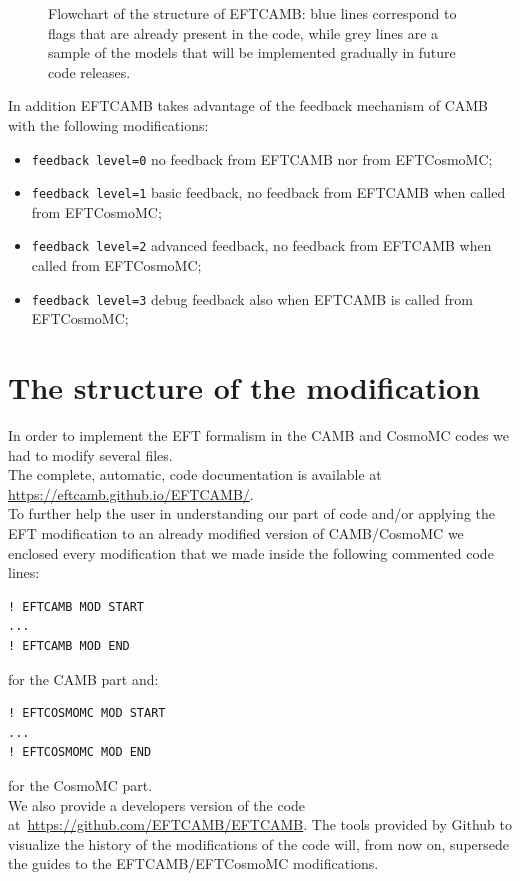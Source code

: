 \documentclass[prd,nofootinbib,showpacs]{revtex4}
\begin{document}
{\begin{figure}[!tp]
\begin{center}
 \caption{\label{Fig:StructureFlowChart} Flowchart of the structure of EFTCAMB: blue lines correspond to flags that are already present in the code, while grey lines are a sample of the models that will be implemented gradually in future code releases.} 
\end{center}
\end{figure}
%
In addition EFTCAMB takes advantage of the feedback mechanism of CAMB with the following modifications:
\begin{itemize}
\item \texttt{feedback level=0} no feedback from EFTCAMB nor from EFTCosmoMC;
\item \texttt{feedback level=1} basic feedback, no feedback from EFTCAMB when called from EFTCosmoMC;
\item \texttt{feedback level=2} advanced feedback, no feedback from EFTCAMB when called from EFTCosmoMC;
\item \texttt{feedback level=3} debug feedback also when EFTCAMB is called from EFTCosmoMC;
\end{itemize}

\section{The structure of the modification}\label{Sec:ModStruct}
%
In order to implement the EFT formalism in the CAMB and CosmoMC codes we had to modify several files. \\
The complete, automatic, code documentation is available at \url{https://eftcamb.github.io/EFTCAMB/}. \\
To further help the user in understanding our part of code and/or applying the EFT modification to an already modified version of CAMB/CosmoMC we enclosed every modification that we made inside the following commented code lines:
%
\begin{verbatim}
! EFTCAMB MOD START
...
! EFTCAMB MOD END
\end{verbatim}
for the CAMB part and:
\begin{verbatim}
! EFTCOSMOMC MOD START
...
! EFTCOSMOMC MOD END
\end{verbatim}
for the CosmoMC part.\\
%

We also provide a developers version of the code at~\url{https://github.com/EFTCAMB/EFTCAMB}.
The tools provided by Github to visualize the history of the modifications of the code will, from now on, supersede the guides to the EFTCAMB/EFTCosmoMC modifications.

}
\end{document}

